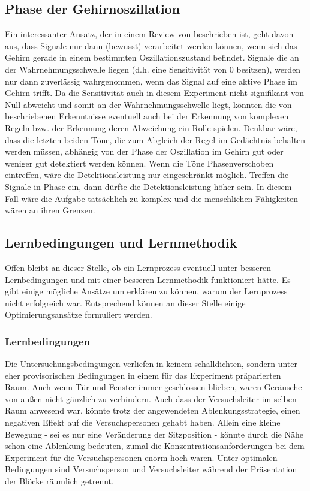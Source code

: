 \documentclass[doc,a4paper,12pt]{apa6}
\begin{document}
\subsection{Phase der Gehirnoszillation}

Ein interessanter Ansatz, der in einem Review von \textcite{vanrullen2011ongoing} beschrieben ist, geht davon aus, dass Signale nur dann (bewusst) verarbeitet werden können, wenn sich das Gehirn gerade in einem bestimmten Oszillationszustand befindet. Signale die an der Wahrnehmungsschwelle liegen (d.h. eine Sensitivität von 0 besitzen), werden nur dann zuverlässig wahrgenommen, wenn das Signal auf eine aktive Phase im Gehirn trifft. Da die Sensitivität auch in diesem Experiment nicht signifikant von Null abweicht und somit an der Wahrnehmungsschwelle liegt, könnten die von \textcite{vanrullen2011ongoing} beschriebenen Erkenntnisse eventuell auch bei der Erkennung von komplexen Regeln bzw. der Erkennung deren Abweichung ein Rolle spielen. Denkbar wäre, dass die letzten beiden Töne, die zum Abgleich der Regel im Gedächtnis behalten werden müssen, abhängig von der Phase der Oszillation im Gehirn gut oder weniger gut detektiert werden können. Wenn die Töne Phasenverschoben eintreffen, wäre die Detektionsleistung nur eingeschränkt möglich. Treffen die Signale in Phase ein, dann dürfte die Detektionsleistung höher sein. In diesem Fall wäre die Aufgabe tatsächlich zu komplex und die menschlichen Fähigkeiten wären an ihren Grenzen.

\subsection{Lernbedingungen und Lernmethodik}

Offen bleibt an dieser Stelle, ob ein Lernprozess eventuell unter besseren Lernbedingungen und mit einer besseren Lernmethodik funktioniert hätte. Es gibt einige mögliche Ansätze um erklären zu können, warum der Lernprozess nicht erfolgreich war. Entsprechend können an dieser Stelle einige Optimierungsansätze formuliert werden.

\subsubsection{Lernbedingungen}

Die Untersuchungsbedingungen verliefen in keinem schalldichten, sondern unter eher provisorischen Bedingungen in einem für das Experiment präparierten Raum. Auch wenn Tür und Fenster immer geschlossen blieben, waren Geräusche von außen nicht gänzlich zu verhindern. Auch dass der Versuchsleiter im selben Raum anwesend war, könnte trotz der angewendeten Ablenkungsstrategie, einen negativen Effekt auf die Versuchspersonen gehabt haben. Allein eine kleine Bewegung - sei es nur eine Veränderung der Sitzposition - könnte durch die Nähe schon eine Ablenkung bedeuten, zumal die Konzentrationsanforderungen bei dem Experiment für die Versuchspersonen enorm hoch waren. Unter optimalen Bedingungen sind Versuchsperson und Versuchsleiter während der Präsentation der Blöcke räumlich getrennt.
\end{document}
